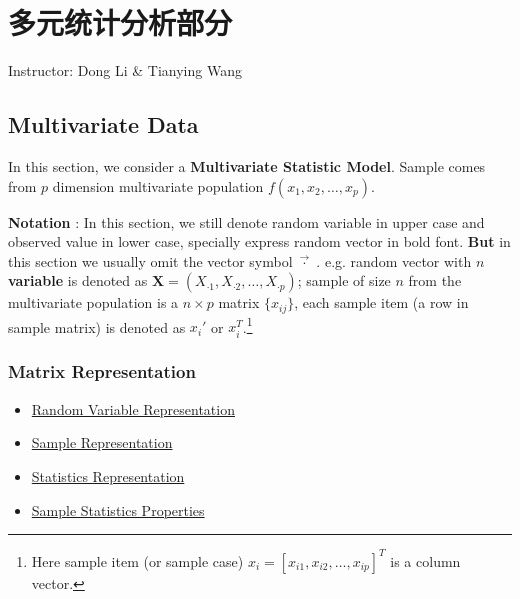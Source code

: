 \chapter{多元统计分析部分}\label{SecMultivariateStatisticalAnalysis}
\begin{center}
    Instructor: Dong Li \& Tianying Wang
\end{center}
\section{Multivariate Data}
    In this section, we consider a \textbf{Multivariate Statistic Model}. Sample comes from $p$ dimension multivariate population $f(x_1,x_2,\ldots,x_p)$.

    \textbf{Notation }: In this section, we still denote random variable in upper case and observed value in lower case, specially express random vector in bold font. \textbf{But} in this section we usually omit the vector symbol $ \vec{\cdot} \,\,$. e.g.
    random vector with $ n $ \textbf{variable }is denoted as $\mathbf{X}=(X_{\cdot 1},X_{\cdot 2},\ldots ,X_{\cdot p})$; sample of size $ n $ from the multivariate population is a $ n\times p $ matrix $ \{x_{ij}\} $, each sample item (a row in sample matrix) is denoted as $ x_i' $ or $ x_i^T $.\footnote{Here sample item (or sample case) $x_i=[x_{i1},x_{i2},\ldots,x_{ip}]^T$ is a column vector.} 


\subsection{Matrix Representation}


    \begin{itemize}[topsep=0pt,itemsep=1pt]
        \item \hyperlink{RandomVariableRepresentation}{Random Variable Representation}
        \item \hyperlink{SampleRepresentation}{Sample Representation}
        \item \hyperlink{StatisticsRepresentation}{Statistics Representation}
        \item \hyperlink{SampleStatisticsProperties}{Sample Statistics Properties}
    \end{itemize}
    



